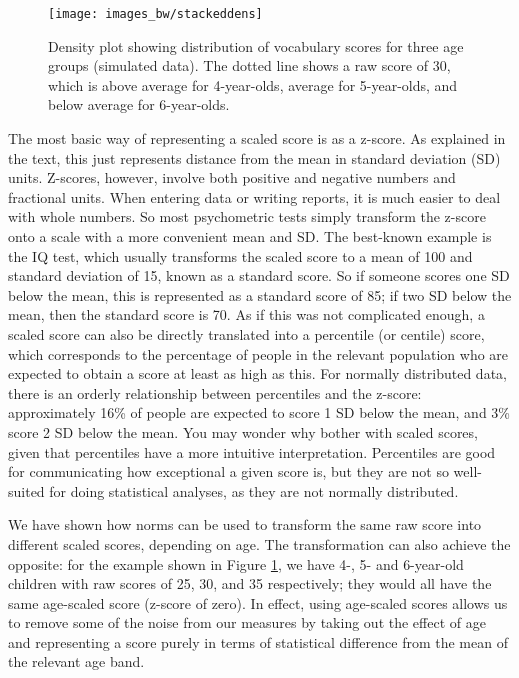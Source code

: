 \documentclass{krantz}
\begin{document}
\begin{figure}
\texttt{[image: images\_bw/stackeddens]} \caption{Density plot showing distribution of vocabulary scores for three age groups (simulated data). The dotted line shows a raw score of 30, which is above average for 4-year-olds, average for 5-year-olds, and below average for 6-year-olds.}\label{fig:normsplot}
\end{figure}

\begin{tcolorbox}[enhanced,colback=Black!5!lightgray,colframe=black!75!black,coltitle=white,title=Scaled scores and percentiles]\label{box:scaledscores}
The most basic way of representing a scaled score is as a z-score. As explained in the text, this just represents distance from the mean in standard deviation (SD) units. Z-scores, however, involve both positive and negative numbers and fractional units. When entering data or writing reports, it is much easier to deal with whole numbers. So most psychometric tests simply transform the z-score onto a scale with a more convenient mean and SD. The best-known example is the IQ test, which usually transforms the scaled score to a mean of 100 and standard deviation of 15, known as a standard score. So if someone scores one SD below the mean, this is represented as a standard score of 85; if two SD below the mean, then the standard score is 70.  
As if this was not complicated enough, a scaled score can also be directly translated into a percentile (or centile) score, which corresponds to the percentage of people in the relevant population who are expected to obtain a score at least as high as this. For normally distributed data, there is an orderly relationship between percentiles and the z-score: approximately 16\% of people are expected to score 1 SD below the mean, and 3\% score 2 SD below the mean.  
You may wonder why bother with scaled scores, given that percentiles have a more intuitive interpretation. Percentiles are good for communicating how exceptional a given score is, but they are not so well-suited for doing statistical analyses, as they are not normally distributed.

\end{tcolorbox}

We have shown how norms can be used to transform the same raw score into different scaled scores, depending on age. The transformation can also achieve the opposite: for the example shown in Figure \ref{fig:normsplot}, we have 4-, 5- and 6-year-old children with raw scores of 25, 30, and 35 respectively; they would all have the same age-scaled score (z-score of zero). In effect, using age-scaled scores allows us to remove some of the noise from our measures by taking out the effect of age and representing a score purely in terms of statistical difference from the mean of the relevant age band.
\end{document}
